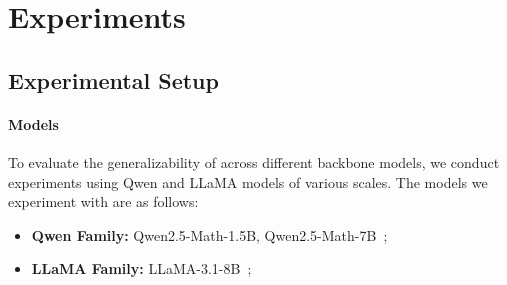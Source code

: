 \section{Experiments}
\label{sec:experiments}

\subsection{Experimental Setup}

\paragraph{Models}
To evaluate the generalizability of \mot across different backbone models, we conduct experiments using Qwen and LLaMA models of various scales.
The models we experiment with are as follows:
\begin{itemize}[leftmargin=2em]
    \item \textbf{Qwen Family:} Qwen2.5-Math-1.5B, Qwen2.5-Math-7B~\citep{yang2024qwen2};
    \item \textbf{LLaMA Family:} LLaMA-3.1-8B~\citep{grattafiori2024llama};
\end{itemize}


